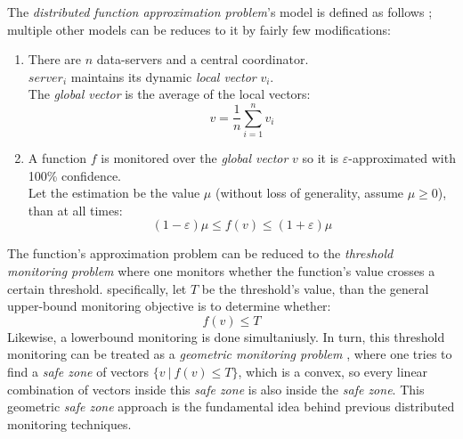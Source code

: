 \documentclass[10pt, conference]{IEEEtran}
\begin{document}
The \textit{distributed function approximation problem}'s model is defined as follows \cite{garofalakis2013sketch}; multiple other models can be reduces to it by fairly few modifications:
\begin{enumerate}
\item There are $n$ data-servers and a central coordinator. \\ $server_i$ maintains its dynamic \textit{local vector} $v_i$. \\ The \textit{global vector} is the average of the local vectors: $$v = \frac{1}{n}\sum\limits_{i=1}^n {v_i}$$
\item A function $f$ is monitored over the \textit{global vector} $v$ so it is $\varepsilon$-approximated with 100\% confidence. \\ Let the estimation  be the value $\mu$ (without loss of generality, assume ${\mu \geq 0}$), than at all times: $$(1-\varepsilon )\mu \leq f(v) \leq (1+\varepsilon )\mu $$
\end{enumerate}
The function's approximation problem can be reduced to the \textit{threshold monitoring problem} \cite{garofalakis2013sketch} where one monitors whether the function's value crosses a certain threshold. specifically, let $T$ be the threshold's value, than the general upper-bound monitoring objective is to determine whether:
\begin{equation}
\label{functionMonitoringConstraint}
f(v) \leq T
\end{equation}
Likewise, a lowerbound monitoring is done simultaniusly. In turn, this threshold monitoring can be treated as a \textit{geometric monitoring problem} \cite{sharfman2007geometric}, where one tries to find a \textit{safe zone} of vectors ${\{v \ | \ f(v) \leq T\}}$, which is a convex, so every linear combination of vectors inside this \textit{safe zone} is also inside the \textit{safe zone}. This geometric \textit{safe zone} approach is the fundamental idea behind previous distributed monitoring techniques.
\end{document}
